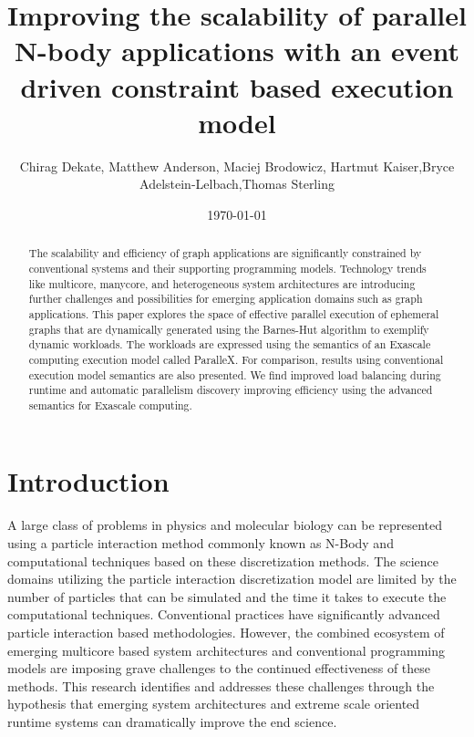 \documentclass[floatfix]{revtex4}
\begin{document}
\title{Improving the scalability of parallel N-body applications with an event driven constraint based execution model}

\author{Chirag Dekate, Matthew Anderson, Maciej Brodowicz, Hartmut Kaiser,Bryce Adelstein-Lelbach,Thomas Sterling}



\date{\today}

\begin{abstract}
The scalability and efficiency of graph applications are significantly constrained
by conventional systems and their supporting programming models. Technology trends
like multicore, manycore, and heterogeneous system architectures are introducing
further challenges and possibilities for emerging application domains such as 
graph applications. This paper
explores the space of effective parallel execution of ephemeral graphs that are dynamically
generated using the Barnes-Hut algorithm to exemplify dynamic workloads. The workloads
are expressed using the semantics of an Exascale computing execution model called ParalleX. 
For comparison, results using conventional execution model semantics are also presented.
We find improved load balancing during runtime and automatic parallelism discovery
improving efficiency using the advanced semantics for Exascale computing. 
\end{abstract}

\maketitle

\section{Introduction}
A large class of problems in physics and molecular biology can be represented using a
particle interaction method commonly known as N-Body and computational techniques 
based on these discretization methods. The science domains utilizing the particle 
interaction discretization model are limited by the number of particles that can be 
simulated and the time it takes to execute the computational techniques. Conventional 
practices have significantly advanced particle interaction based methodologies. However, 
the combined ecosystem of emerging multicore based system architectures and conventional 
programming models are imposing grave challenges to the continued effectiveness of 
these methods. This research identifies and addresses these challenges through 
the hypothesis that emerging system architectures and extreme scale oriented 
runtime systems can dramatically improve the end science.
\end{document}
